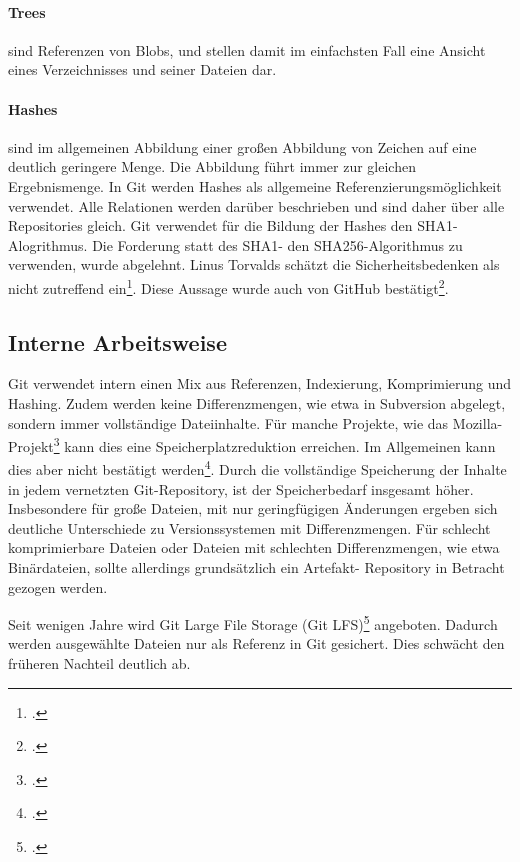 \paragraph{Trees} sind Referenzen von Blobs, und stellen damit im einfachsten Fall eine Ansicht eines Verzeichnisses und 
seiner Dateien dar.

\paragraph{Hashes} sind im allgemeinen Abbildung einer großen Abbildung von Zeichen auf eine deutlich geringere Menge. 
Die Abbildung führt immer zur gleichen Ergebnismenge. In Git werden Hashes als allgemeine Referenzierungsmöglichkeit 
verwendet. Alle Relationen werden darüber beschrieben und sind daher über alle Repositories gleich. Git verwendet für die 
Bildung der Hashes den SHA1-Alogrithmus. Die Forderung statt des SHA1- den SHA256-Algorithmus zu verwenden, wurde 
abgelehnt. Linus Torvalds schätzt die Sicherheitsbedenken als nicht zutreffend ein\footcite[vgl.][]{git-sha-torvalds}. Diese 
Aussage wurde auch von GitHub bestätigt\footcite[vgl.][]{git-sha-github}.

\subsection{Interne Arbeitsweise}

Git verwendet intern einen Mix aus Referenzen, Indexierung, Komprimierung und Hashing. Zudem werden keine 
Differenzmengen, wie etwa in Subversion abgelegt, sondern immer vollständige Dateiinhalte. Für manche Projekte, wie das 
Mozilla-Projekt\footcite[vgl.][]{kernel-git-svn} kann dies eine Speicherplatzreduktion erreichen. Im Allgemeinen kann dies aber nicht bestätigt werden\footcite[vgl.][]{svn-vs-git}. Durch die vollständige Speicherung der Inhalte in jedem vernetzten Git-Repository, ist der Speicherbedarf insgesamt höher. Insbesondere für große Dateien, mit nur geringfügigen Änderungen ergeben sich deutliche Unterschiede zu Versionssystemen mit Differenzmengen. Für schlecht komprimierbare Dateien oder Dateien mit schlechten Differenzmengen, wie etwa Binärdateien, sollte allerdings grundsätzlich ein Artefakt-
Repository in Betracht gezogen werden. 

Seit wenigen Jahre wird \glqq Git Large File Storage\grqq{} (Git LFS)\footcite{git-lfs} angeboten. Dadurch werden ausgewählte Dateien nur als Referenz in Git gesichert. Dies schwächt den früheren Nachteil deutlich ab.

